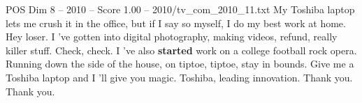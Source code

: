 \begin{textsample}{POS Dim 8 – 2010 – Score 1.00 – 2010/tv\_com\_2010\_11.txt}  \label{ex:f8_pos_057}
My Toshiba laptop lets me crush it in the office, but if I say so myself, I do my best work at home.
Hey loser.
I 've gotten into digital photography, making videos, refund, really killer stuff.
Check, check.
I 've also \textbf{started} work on a college football rock opera.
Running down the side of the house, on tiptoe, tiptoe, stay in bounds.
Give me a Toshiba laptop and I 'll give you magic.
Toshiba, leading innovation.
Thank you.
Thank you.

\end{textsample}
